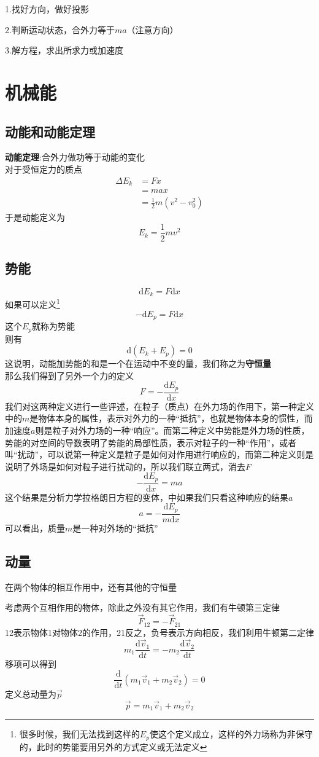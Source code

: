 \documentclass[hyperref,UTF8]{ctexart}
\newcommand{\D}{\mathrm{d}}
\begin{document}
1.找好方向，做好投影

2.判断运动状态，合外力等于$ma$（注意方向）

3.解方程，求出所求力或加速度
\section{机械能}
\subsection{动能和动能定理}
\textbf{动能定理}:合外力做功等于动能的变化\\
对于受恒定力的质点
\begin{align*}
    \Delta E_k &= Fx \\
    &=max \\ 
    &=\frac12 m(v^2-v_0^2)
\end{align*}
于是动能定义为
\[E_k = \frac12 mv^2\]
\subsection{势能}
\[\D E_k = F \D x\]
如果可以定义\footnote{很多时候，我们无法找到这样的$E_p$使这个定义成立，这样的外力场称为非保守的，此时的势能要用另外的方式定义或无法定义}
\[-\D E_p = F \D x\]
这个$E_p$就称为势能\\则有
\[\D (E_k+E_p) = 0\]
这说明，动能加势能的和是一个在运动中不变的量，我们称之为\textbf{守恒量}\\
那么我们得到了另外一个力的定义
\[F = -\frac{\D E_p}{\D x}\]
我们对这两种定义进行一些评述，在粒子（质点）在外力场的作用下，第一种定义中的$m$是物体本身的属性，表示对外力的一种“抵抗”，也就是物体本身的惯性，而加速度$a$则是粒子对外力场的一种“响应”。而第二种定义中势能是外力场的性质，势能的对空间的导数表明了势能的局部性质，表示对粒子的一种“作用”，或者叫“扰动”，可以说第一种定义是粒子是如何对作用进行响应的，而第二种定义则是说明了外场是如何对粒子进行扰动的，所以我们联立两式，消去$F$
\[-\frac{\D E_p}{\D x} = ma\]
这个结果是分析力学拉格朗日方程的变体，中如果我们只看这种响应的结果$a$
\[a = -\frac{\D E_p}{m\D x}\]
可以看出，质量$m$是一种对外场的“抵抗”
\subsection{动量}
在两个物体的相互作用中，还有其他的守恒量

考虑两个互相作用的物体，除此之外没有其它作用，我们有牛顿第三定律
\[\vec{F}_{12} = - \vec{F}_{21}\]
12表示物体1对物体2的作用，21反之，负号表示方向相反，我们利用牛顿第二定律
\[m_1\frac{\D \vec{v}_1}{\D t}=-m_2\frac{\D \vec{v}_2}{\D t}\]
移项可以得到
\[\frac{\D }{\D t}(m_1\vec{v}_1+m_2\vec{v}_2)=0\]
定义总动量为$\vec{p}$
\[\vec{p} = m_1\vec{v}_1+m_2\vec{v}_2\]
\end{document}
